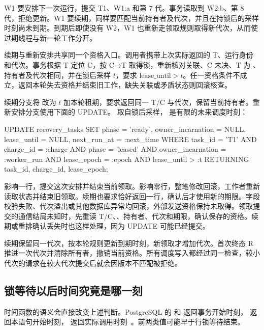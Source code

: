 
W1 要安排下一次运行，提交 T1、W1:a 和第 7 代。事务读取到 W2:b、第 8 代，拒绝更新。W1 要续期，同样要匹配当前持有者及代次，并且在持锁后的采样时刻尚未到期。到期后即使没有 W2，W1 也重新走领取规则取得新代次，从而使过期线程与新一轮工作分开。

续期与重新安排共享同一个资格入口。调用者携带上次实际返回的 T、运行身份和代次。事务根据 T 定位 C，按 C→T 取得锁，重新核对关联、C 未决、T 为 、持有者及代次相同，并在锁后采样 \(t\)，要求 \(\text{lease\_until}>t\)。任一资格条件不成立，返回本轮失去资格并结束旧工作，缺失关联或矛盾状态则回滚核查。

续期分支将  改为 \(t\) 加本轮租期，要求返回同一 T/C 与代次，保留当前持有者。重新安排分支使用下面的 UPDATE。 取自锁后采样， 是有限的未来调度时刻：

\begin{BookCode}
UPDATE recovery_tasks
SET phase = 'ready',
    owner_incarnation = NULL,
    lease_until = NULL,
    next_run_at = :next_time
WHERE task_id = 'T1'
  AND charge_id = :charge
  AND phase = 'leased'
  AND owner_incarnation = :worker_run
  AND lease_epoch = :epoch
  AND lease_until > :t
RETURNING task_id, charge_id, lease_epoch;
\end{BookCode}

影响一行，提交这次安排并结束当前领取。影响零行，整笔修改回滚，工作者重新读取状态并结束旧领取。续期也要求恰好返回一行，确认后才使用新的期限。字段校验失败、代次溢出或其他数据库异常均回滚，外部发送资格保持未取得。领取提交的通信结局未知时，先重读 T/C、、持有者、代次和期限，确认保存的资格。续期或重排确认丢失时也这样处理，因为 UPDATE 可能已经提交。

续期保留同一代次，按本轮规则更新到期时刻，新领取才增加代次。首次终态 R 推进一次代次并清除所有者，撤销当前资格。所有调度写入都经过同一检查，较小代次的请求在较大代次提交后就会因版本不匹配被拒绝。

\subsection*{锁等待以后时间究竟是哪一刻}

时间函数的语义会直接改变上述判断。PostgreSQL 的  和  返回事务开始时刻， 返回本语句开始时刻， 返回实际调用时刻~\cite{pg}。前两类值可能早于行锁等待结束。


